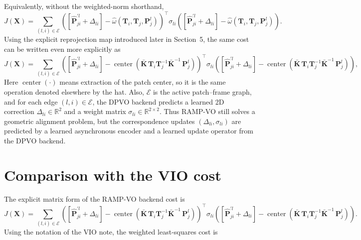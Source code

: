 \documentclass[11pt]{article}
\newcommand{\R}{\mathbb{R}}
\newcommand{\T}{^{\top}}
\begin{document}
Equivalently, without the weighted-norm shorthand,
\begin{equation}
J(\mathbf{X}) =
\sum_{(l,i)\in \mathcal{E}}
\left(
\left[\hat{\mathbf{P}}_{ji}^{\prime l} + \Delta_{li}\right] - \hat{\omega}(\mathbf{T}_i,\mathbf{T}_j,\mathbf{P}_j^l)
\right)\T
\sigma_{li}
\left(
\left[\hat{\mathbf{P}}_{ji}^{\prime l} + \Delta_{li}\right] - \hat{\omega}(\mathbf{T}_i,\mathbf{T}_j,\mathbf{P}_j^l)
\right).
\end{equation}
Using the explicit reprojection map introduced later in Section~5, the same cost can be written even more explicitly as
\begin{equation}
J(\mathbf{X}) =
\sum_{(l,i)\in \mathcal{E}}
\left(
\left[\hat{\mathbf{P}}_{ji}^{\prime l} + \Delta_{li}\right] -
\operatorname{center}\!\left(\bar{\mathbf{K}}\,\mathbf{T}_i\mathbf{T}_j^{-1}\bar{\mathbf{K}}^{-1}\,\mathbf{P}_j^l\right)
\right)\T
\sigma_{li}
\left(
\left[\hat{\mathbf{P}}_{ji}^{\prime l} + \Delta_{li}\right] -
\operatorname{center}\!\left(\bar{\mathbf{K}}\,\mathbf{T}_i\mathbf{T}_j^{-1}\bar{\mathbf{K}}^{-1}\,\mathbf{P}_j^l\right)
\right),
\end{equation}
Here \(\operatorname{center}(\cdot)\) means extraction of the patch center, so it is the same operation denoted elsewhere by the hat. Also, \(\mathcal{E}\) is the active patch--frame graph, and for each edge \((l,i)\in\mathcal{E}\), the DPVO backend predicts a learned 2D correction \(\Delta_{li}\in\R^2\) and a weight matrix \(\sigma_{li}\in\R^{2\times 2}\).
Thus RAMP-VO still solves a geometric alignment problem, but the correspondence updates \((\Delta_{li},\sigma_{li})\) are predicted by a learned asynchronous encoder and a learned update operator from the DPVO backend.

\section{Comparison with the VIO cost}

The explicit matrix form of the RAMP-VO backend cost is
\begin{equation}
J(\mathbf{X}) =
\sum_{(l,i)\in \mathcal{E}}
\left(
\left[\hat{\mathbf{P}}_{ji}^{\prime l} + \Delta_{li}\right] -
\operatorname{center}\!\left(\bar{\mathbf{K}}\,\mathbf{T}_i\mathbf{T}_j^{-1}\bar{\mathbf{K}}^{-1}\,\mathbf{P}_j^l\right)
\right)\T
\sigma_{li}
\left(
\left[\hat{\mathbf{P}}_{ji}^{\prime l} + \Delta_{li}\right] -
\operatorname{center}\!\left(\bar{\mathbf{K}}\,\mathbf{T}_i\mathbf{T}_j^{-1}\bar{\mathbf{K}}^{-1}\,\mathbf{P}_j^l\right)
\right).
\end{equation}
Using the notation of the VIO note, the weighted least-squares cost is
\end{document}

